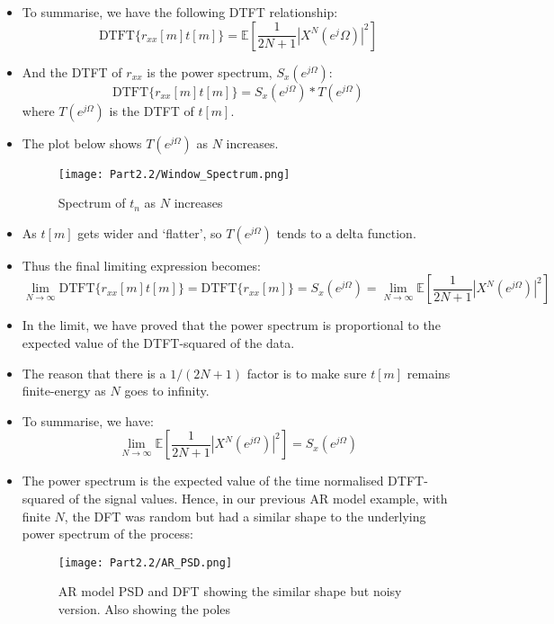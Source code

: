 \documentclass[12pt]{article}
\newcommand{\mexp}{\mathbb{E}}
\newcommand{\autocox}{r_{xx}}
\newcommand{\ejomg}{e^{j\Omega}}
\newcommand{\DTFT}{\textrm{DTFT}}
\begin{document}
    \begin{itemize}
        \item To summarise, we have the following DTFT relationship:
        \[
        \DTFT\{\autocox[m]t[m] \} = \mexp[\frac{1}{2N+1}|X^N(e^j\Omega)|^2]
        \]
        \item And the DTFT of $\autocox$ is the power spectrum, $S_x(\ejomg)$:
        \[
        \DTFT\{\autocox[m]t[m] \} = S_x(\ejomg) * T(\ejomg)
        \]
        where $T(\ejomg)$ is the DTFT of $t[m]$.
        \item The plot below shows $T(\ejomg)$ as $N$ increases.
       
    \begin{figure}[H]
        \centering
        \texttt{[image: Part2.2/Window\_Spectrum.png]}
        \caption{Spectrum of $t_n$ as $N $ increases}
    \end{figure}
    \item As $t[m]$ gets wider and `flatter', so $T(\ejomg)$ tends to a delta function.
    \item Thus the final limiting expression becomes:
    \[
    \lim_{N\rightarrow \infty} \DTFT \{\autocox[m]t[m] \} = \DTFT\{ \autocox[m]\} = S_x(\ejomg) = \lim_{N \rightarrow \infty} \mexp[\frac{1}{2N+1}|X^N(\ejomg)|^2]
    \]
    \item In the limit, we have proved that the power spectrum is proportional to the expected value of the \DTFT -squared of the data. 
    \item The reason that there is a $1/(2N+1)$ factor is to make sure $t[m]$ remains finite-energy as $N$ goes to infinity. 
    \item To summarise, we have:
    \[
    \lim_{N \rightarrow \infty} \mexp[\frac{1}{2N+1}|X^N(\ejomg)|^2] = S_x(\ejomg)
    \]
    \item The power spectrum is the expected value of the time normalised DTFT-squared of the signal values. Hence, in our previous AR model example, with finite $N$, the DFT was random but had a similar shape to the underlying power spectrum of the process:
    \begin{figure}[H]
            \centering
            \texttt{[image: Part2.2/AR\_PSD.png]}
            \caption{AR model PSD and DFT showing the similar shape but noisy version. Also showing the poles}
        \end{figure}
    \end{itemize} 
\end{document}
